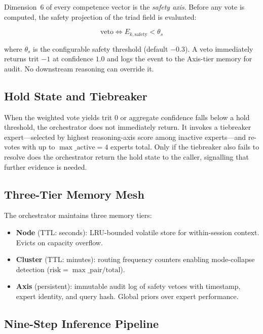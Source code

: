 \documentclass[11pt,a4paper]{article}
\begin{document}
Dimension~6 of every competence vector is the \emph{safety axis}. Before
any vote is computed, the safety projection of the triad field is evaluated:

\begin{equation}
  \text{veto} \iff E_{k,\text{safety}} < \theta_s
  \label{eq:veto}
\end{equation}

where $\theta_s$ is the configurable safety threshold (default $-0.3$).
A veto immediately returns trit $-1$ at confidence $1.0$ and logs the event
to the Axis-tier memory for audit. No downstream reasoning can override it.

\subsection{Hold State and Tiebreaker}

When the weighted vote yields trit $0$ or aggregate confidence falls below
a hold threshold, the orchestrator does not immediately return. It invokes a
tiebreaker expert—selected by highest reasoning-axis score among inactive
experts—and re-votes with up to $\max\_\text{active}=4$ experts total. Only
if the tiebreaker also fails to resolve does the orchestrator return the
hold state to the caller, signalling that further evidence is needed.

\subsection{Three-Tier Memory Mesh}

The orchestrator maintains three memory tiers:

\begin{itemize}
  \item \textbf{Node} (TTL: seconds): LRU-bounded volatile store for
        within-session context. Evicts on capacity overflow.
  \item \textbf{Cluster} (TTL: minutes): routing frequency counters enabling
        mode-collapse detection ($\text{risk} = \max\_\text{pair} / \text{total}$).
  \item \textbf{Axis} (persistent): immutable audit log of safety vetoes with
        timestamp, expert identity, and query hash. Global priors over expert
        performance.
\end{itemize}

\subsection{Nine-Step Inference Pipeline}
\end{document}

